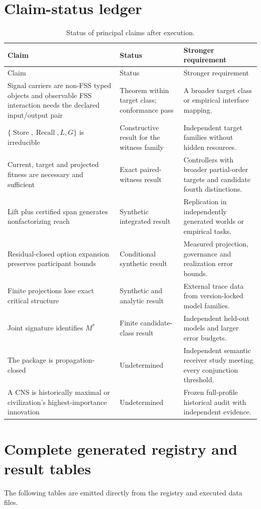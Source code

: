 \documentclass[10pt]{article}
\newcommand{\Store}{\operatorname{Store}}
\newcommand{\Recall}{\operatorname{Recall}}
\begin{document}
\section{Claim-status ledger}
\begin{longtable}{p{}p{}p{}}
\caption{Status of principal claims after execution.}\label{tab:status}\\
\toprule Claim & Status & Stronger requirement \\
\midrule\endfirsthead
\toprule Claim & Status & Stronger requirement \\
\midrule\endhead
Signal carriers are non-FSS typed objects and observable FSS interaction needs the declared input/output pair & Theorem within target class; conformance pass & A broader target class or empirical interface mapping.\\
$\{\Store,\Recall,L,G\}$ is irreducible & Constructive result for the witness family & Independent target families without hidden resources.\\
Current, target and projected fitness are necessary and sufficient & Exact paired-witness result & Controllers with broader partial-order targets and candidate fourth distinctions.\\
Lift plus certified span generates nonfactorizing reach & Synthetic integrated result & Replication in independently generated worlds or empirical tasks.\\
Residual-closed option expansion preserves participant bounds & Conditional synthetic result & Measured projection, governance and realization error bounds.\\
Finite projections lose exact critical structure & Synthetic and analytic result & External trace data from version-locked model families.\\
Joint signature identifies $M^*$ & Finite candidate-class result & Independent held-out models and larger error budgets.\\
The package is propagation-closed & Undetermined & Independent semantic receiver study meeting every conjunction threshold.\\
A CNS is historically maximal or civilization's highest-importance innovation & Undetermined & Frozen full-profile historical audit with independent evidence.\\
\bottomrule
\end{longtable}

\section{Complete generated registry and result tables}
The following tables are emitted directly from the registry and executed data files.
\end{document}
